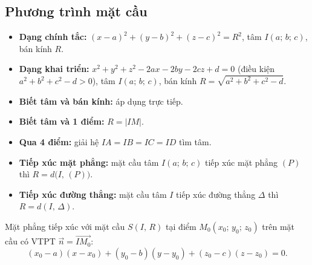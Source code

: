 \documentclass[12pt,a4paper]{article}
\begin{document}
\subsection{Phương trình mặt cầu}

\begin{dinhnghia}
  \begin{itemize}
    \item \textbf{Dạng chính tắc:}
      $(x - a)^2 + (y - b)^2 + (z - c)^2 = R^2$,
      \;tâm $I(a;\, b;\, c)$, bán kính $R$.
    \item \textbf{Dạng khai triển:}
      $x^2 + y^2 + z^2 - 2ax - 2by - 2cz + d = 0$
      \;(điều kiện $a^2 + b^2 + c^2 - d > 0$),
      \;tâm $I(a;\, b;\, c)$, bán kính $R = \sqrt{a^2 + b^2 + c^2 - d}$.
  \end{itemize}
\end{dinhnghia}

\begin{phuongphap}[title={Viết phương trình mặt cầu}]
  \begin{itemize}
    \item \textbf{Biết tâm và bán kính:} áp dụng trực tiếp.
    \item \textbf{Biết tâm và 1 điểm:} $R = |IM|$.
    \item \textbf{Qua 4 điểm:} giải hệ $IA = IB = IC = ID$ tìm tâm.
    \item \textbf{Tiếp xúc mặt phẳng:} mặt cầu tâm $I(a;\,b;\,c)$ tiếp xúc mặt phẳng $(P)$ thì $R = d\bigl(I,\,(P)\bigr)$.
    \item \textbf{Tiếp xúc đường thẳng:} mặt cầu tâm $I$ tiếp xúc đường thẳng $\Delta$ thì $R = d(I,\,\Delta)$.
  \end{itemize}
\end{phuongphap}

\begin{congthuc}[title={Phương trình mặt phẳng tiếp xúc mặt cầu}]
  Mặt phẳng tiếp xúc với mặt cầu $S(I,\,R)$ tại điểm $M_0(x_0;\,y_0;\,z_0)$ trên mặt cầu có VTPT $\vec{n} = \overrightarrow{IM_0}$:
  \[
    (x_0 - a)(x - x_0) + (y_0 - b)(y - y_0) + (z_0 - c)(z - z_0) = 0.
  \]
\end{congthuc}
\end{document}
